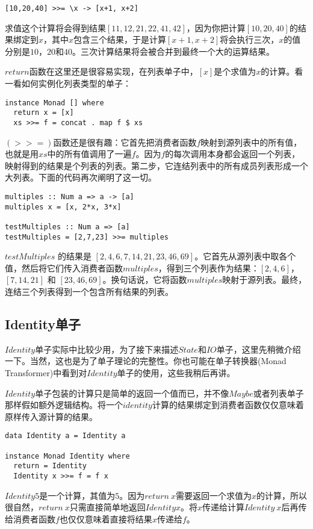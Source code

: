 \begin{lstlisting}
[10,20,40] >>= \x -> [x+1, x+2]
\end{lstlisting}

求值这个计算将会得到结果$[11,12,21,22,41,42]$，因为你把计算$[10,20,40]$的结果绑定到$x$，其中$x$包含三个结果，于是计算$[x+1, x+2]$将会执行三次，$x$的值分别是$10$，$20$和$40$。三次计算结果将会被合并到最终一个大的运算结果。

$return$函数在这里还是很容易实现，在列表单子中，$[x]$是个求值为$x$的计算。看一看如何实例化列表类型的单子：

\begin{lstlisting}
instance Monad [] where
  return x = [x]
  xs >>= f = concat . map f $ xs
\end{lstlisting}

$(>>=)$函数还是很有趣：它首先把消费者函数$f$映射到源列表中的所有值，也就是用$xs$中的所有值调用了一遍$f$。因为$f$的每次调用本身都会返回一个列表，映射得到的结果是个列表的列表。第二步，它连结列表中的所有成员列表形成一个大列表。下面的代码再次阐明了这一切。

\begin{lstlisting}
multiples :: Num a => a -> [a]
multiples x = [x, 2*x, 3*x]

testMultiples :: Num a => [a]
testMultiples = [2,7,23] >>= multiples
\end{lstlisting}

$testMultiples$ 的结果是 $[2,4,6,7,14,21,23,46,69]$。它首先从源列表中取各个值，然后将它们传入消费者函数$multiples$，得到三个列表作为结果：$[2,4,6]$， $[7,14,21]$ 和 $[23,46,69]$。换句话说，它将函数$multiples$映射于源列表。最终，连结三个列表得到一个包含所有结果的列表。

\subsection{Identity单子}

$Identity$单子实际中比较少用，为了接下来描述$State$和$IO$单子，这里先稍微介绍一下。当然，这也是为了单子理论的完整性。你也可能在单子转换器(Monad Transformer)中看到对$Identity$单子的使用，这些我稍后再讲。

$Identity$单子包装的计算只是简单的返回一个值而已，并不像$Maybe$或者列表单子那样假如额外逻辑结构。将一个$identity$计算的结果绑定到消费者函数仅仅意味着原样传入源计算的结果。

\begin{lstlisting}
data Identity a = Identity a

instance Monad Identity where
  return = Identity
  Identity x >>= f = f x
\end{lstlisting}

$Identity 5$是一个计算，其值为$5$。因为$return\ x$需要返回一个求值为$x$的计算，所以很自然，$return\ x$只需直接简单地返回$Identity x$。将$x$传递给计算$Identity\ x$后再传给消费者函数$f$也仅仅意味着直接将结果$x$传递给$f$。
